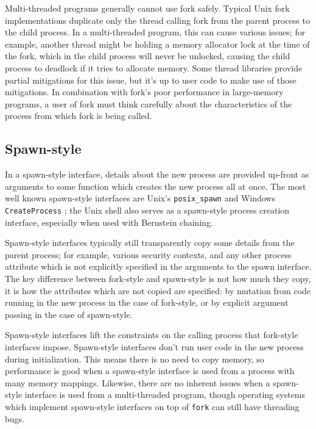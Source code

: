 \documentclass[sigplan]{acmart}
\begin{document}
Multi-threaded programs generally cannot use fork safely.
Typical Unix fork implementations duplicate only the thread calling fork from the parent process to the child process.
In a multi-threaded program, this can cause various issues;
for example, another thread might be holding a memory allocator lock at the time of the fork,
which in the child process will never be unlocked,
causing the child process to deadlock if it tries to allocate memory.
Some thread libraries provide partial mitigations for this issue,
but it's up to user code to make use of those mitigations.\cite{pthread_atfork}
In combination with fork's poor performance in large-memory programs,
a user of fork must think carefully
about the characteristics of the process from which fork is being called.
\subsection{Spawn-style}
In a spawn-style interface,
details about the new process are provided up-front as arguments to some function
which creates the new process all at once.
The most well known spawn-style interfaces are Unix's \texttt{posix\_spawn} \cite{posix_spawn}
and Windows \texttt{CreateProcess} \cite{create_process};
the Unix shell also serves as a spawn-style process creation interface,
especially when used with Bernstein chaining.\cite{chainloading}

Spawn-style interfaces typically still transparently copy some details from the parent process;
for example, various security contexts,
and any other process attribute which is not explicitly specified in the arguments to the spawn interface.
The key difference between fork-style and spawn-style is not how much they copy,
it is how the attributes which are not copied are specified:
by mutation from code running in the new process in the case of fork-style,
or by explicit argument passing in the case of spawn-style.

Spawn-style interfaces lift the constraints on the calling process that fork-style interfaces impose.
Spawn-style interfaces don't run user code in the new process during initialization.
This means there is no need to copy memory,
so performance is good when a spawn-style interface is used from a process with many memory mappings.
Likewise, there are no inherent issues when a spawn-style interface is used from a multi-threaded program,
though operating systems which implement spawn-style interfaces on top of \texttt{fork} can still have threading bugs.
\end{document}
